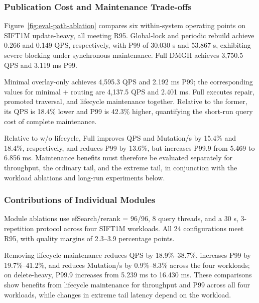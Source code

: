 \documentclass[sigconf,pbalance]{acmart}
\begin{document}
\subsubsection{Publication Cost and Maintenance Trade-offs}
\label{sec:path-ablation}



Figure~\ref{fig:eval-path-ablation} compares six within-system operating points on SIFT1M update-heavy, all meeting R95. Global-lock and periodic rebuild achieve 0.266 and 0.149 QPS, respectively, with P99 of 30.030 s and 53.867 s, exhibiting severe blocking under synchronous maintenance. Full DMGH achieves 3,750.5 QPS and 3.119 ms P99.

Minimal overlay-only achieves 4,595.3 QPS and 2.192 ms P99; the corresponding values for minimal + routing are 4,137.5 QPS and 2.401 ms. Full executes repair, promoted traversal, and lifecycle maintenance together. Relative to the former, its QPS is 18.4\% lower and P99 is 42.3\% higher, quantifying the short-run query cost of complete maintenance.

Relative to w/o lifecycle, Full improves QPS and Mutation/s by 15.4\% and 18.4\%, respectively, and reduces P99 by 13.6\%, but increases P99.9 from 5.469 to 6.856 ms. Maintenance benefits must therefore be evaluated separately for throughput, the ordinary tail, and the extreme tail, in conjunction with the workload ablations and long-run experiments below.

\subsubsection{Contributions of Individual Modules}
\label{sec:module-ablation}

Module ablations use efSearch/rerank = 96/96, 8 query threads, and a 30 s, 3-repetition protocol across four SIFT1M workloads. All 24 configurations meet R95, with quality margins of 2.3--3.9 percentage points.

Removing lifecycle maintenance reduces QPS by 18.9\%--38.7\%, increases P99 by 19.7\%--41.2\%, and reduces Mutation/s by 0.9\%--8.3\% across the four workloads; on delete-heavy, P99.9 increases from 5.239 ms to 16.430 ms. These comparisons show benefits from lifecycle maintenance for throughput and P99 across all four workloads, while changes in extreme tail latency depend on the workload.
\end{document}
